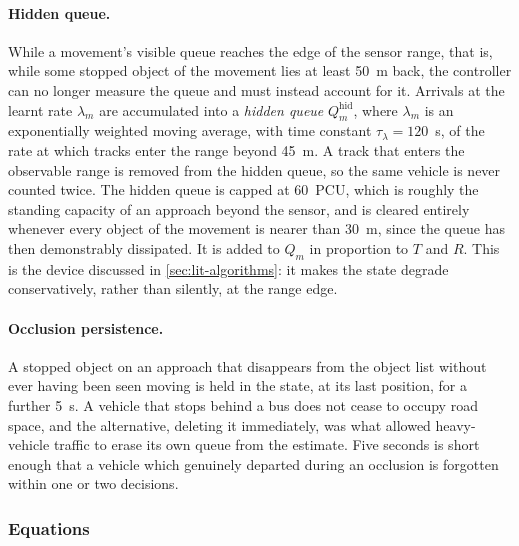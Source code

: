 \paragraph{Hidden queue.} While a movement's visible queue reaches the edge of the sensor range, that is,
while some stopped object of the movement lies at least 50~m back, the controller can no longer measure the
queue and must instead account for it. Arrivals at the learnt rate $\lambda_m$ are accumulated into a
\emph{hidden queue} $Q^{\text{hid}}_m$, where $\lambda_m$ is an exponentially weighted moving average, with
time constant $\tau_\lambda = 120$~s, of the rate at which tracks enter the range beyond 45~m. A track that
enters the observable range is removed from the hidden queue, so the same vehicle is never counted twice. The
hidden queue is capped at 60~PCU, which is roughly the standing capacity of an approach beyond the sensor, and
is cleared entirely whenever every object of the movement is nearer than 30~m, since the queue has then
demonstrably dissipated. It is added to $Q_m$ in proportion to $T$ and $R$. This is the device discussed in
\cref{sec:lit-algorithms}: it makes the state degrade conservatively, rather than silently, at the range edge.

\paragraph{Occlusion persistence.} A stopped object on an approach that disappears from the object list
without ever having been seen moving is held in the state, at its last position, for a further 5~s. A vehicle
that stops behind a bus does not cease to occupy road space, and the alternative, deleting it immediately, was
what allowed heavy-vehicle traffic to erase its own queue from the estimate. Five seconds is short enough that
a vehicle which genuinely departed during an occlusion is forgotten within one or two decisions.

\subsubsection{Equations}

